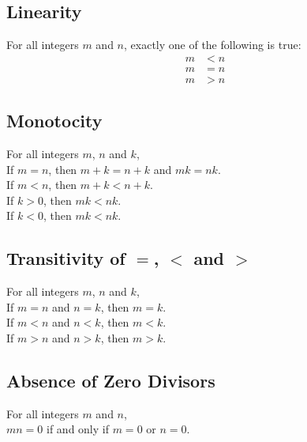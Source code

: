 \documentclass[../notes.tex]{subfiles}
\begin{document}
			\subsection{Linearity}
				For all integers $m$ and $n$, exactly one of the following is true:
				\begin{align*}
					m &< n\\
					m &= n\\
					m &> n
				\end{align*}
			\subsection{Monotocity}
				For all integers $m$, $n$ and $k$,\\
				\-\hspace{2em}If $m = n$, then $m + k = n + k$ and $mk = nk$.\\
				\-\hspace{2em}If $m < n$, then $m + k < n + k$.\\
				\-\hspace{4em}If $k > 0$, then $mk < nk$.\\
				\-\hspace{4em}If $k < 0$, then $mk < nk$.
			\subsection{Transitivity of \texorpdfstring{$=$}{=}, \texorpdfstring{$<$}{<} and \texorpdfstring{$>$}{>}}
				For all integers $m$, $n$ and $k$,\\
				\-\hspace{2em}If $m = n$ and $n = k$, then $m = k$.\\
				\-\hspace{2em}If $m < n$ and $n < k$, then $m < k$.\\
				\-\hspace{2em}If $m > n$ and $n > k$, then $m > k$.
			\subsection{Absence of Zero Divisors}
				For all integers $m$ and $n$,\\
				\-\hspace{2em}$mn = 0$ if and only if $m = 0$ or $n = 0$.
\end{document}
